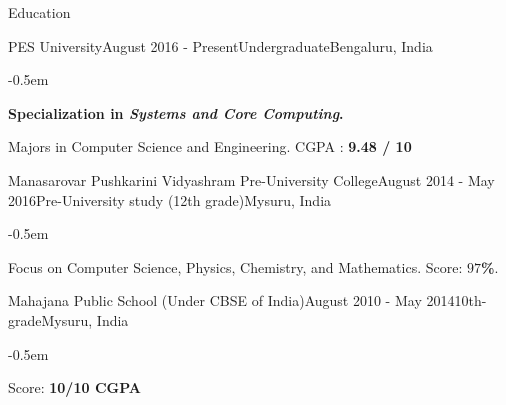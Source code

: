 \documentclass{CV} %
\begin{document}
\begin{rSection}{Education}


  \begin{rSubsection}{PES University}{August 2016 - Present}{Undergraduate}{Bengaluru, India}
    \begin{list}{}{\footnotesize}\itemsep -0.5em \vspace{-0.5em}
      \item {\bf Specialization in \textit{Systems and Core Computing}.}
      \item Majors in Computer Science and Engineering. CGPA : {\bf 9.48 / 10}
    \end{list}
  \end{rSubsection}
  
  \begin{rSubsection}{Manasarovar Pushkarini Vidyashram Pre-University College}{August 2014 - May 2016}{Pre-University study \tiny{(12th grade)}}{Mysuru, India}
    \begin{list}{}{\footnotesize}\itemsep -0.5em \vspace{-0.5em}
      \item Focus on Computer Science, Physics, Chemistry, and Mathematics. Score: {\bf $97$\%}.
    \end{list}
  \end{rSubsection}

  \newpage
  
  \begin{rSubsection}{Mahajana Public School \scriptsize{(Under CBSE of India)}}{August 2010 - May 2014}{10th-grade}{Mysuru, India}
    \begin{list}{}{\footnotesize}\itemsep -0.5em \vspace{-0.5em}
      \item Score: {\bf 10/10 CGPA}
    \end{list}
  \end{rSubsection}

\end{rSection}


\end{document}
